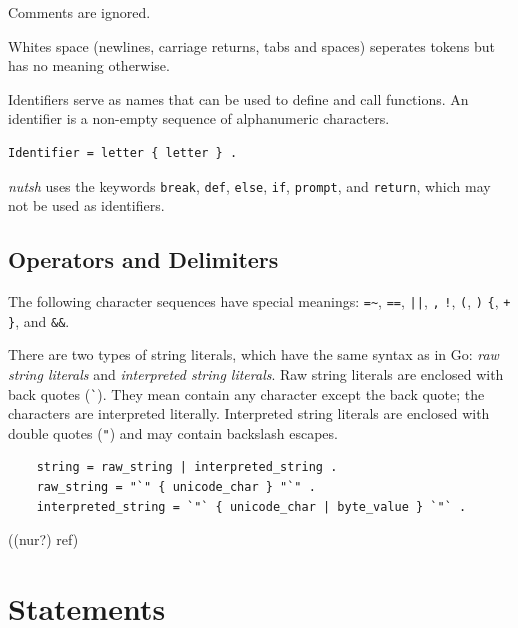 \documentclass[paper=a4,abstract=on,cleardoublepage=empty,numbers=noenddot,toc=bib]{scrreprt}
\begin{document}
Comments are ignored.


Whites space (newlines, carriage returns, tabs and spaces) seperates tokens but has no meaning otherwise.


Identifiers serve as names that can be used to define and call functions. An identifier is a non-empty sequence of alphanumeric characters.

\begin{lstlisting}
Identifier = letter { letter } .
\end{lstlisting}


\emph{nutsh} uses the keywords \texttt{break}, \texttt{def}, \texttt{else}, \texttt{if}, \texttt{prompt}, and \texttt{return}, which may not be used as identifiers.

\subsection{Operators and Delimiters}

The following character sequences have special meanings: \texttt{=\~},
\texttt{==},
\texttt{||},
\texttt{,}
\texttt{!},
\texttt{(},
\texttt{)}
\texttt{\{},
\texttt{+}
\texttt{\}}, and
\texttt{\&\&}.


There are two types of string literals, which have the same syntax as in Go: \emph{raw string literals} and \emph{interpreted string literals}. Raw string literals are enclosed with back quotes (\texttt{\`}). They mean contain any character except the back quote; the characters are interpreted literally. Interpreted string literals are enclosed with double quotes (\texttt{"}) and may contain backslash escapes.

\begin{lstlisting}
    string = raw_string | interpreted_string .
    raw_string = "`" { unicode_char } "`" .
    interpreted_string = `"` { unicode_char | byte_value } `"` .
\end{lstlisting}

((nur?) ref)

\section{Statements}

\end{document}
